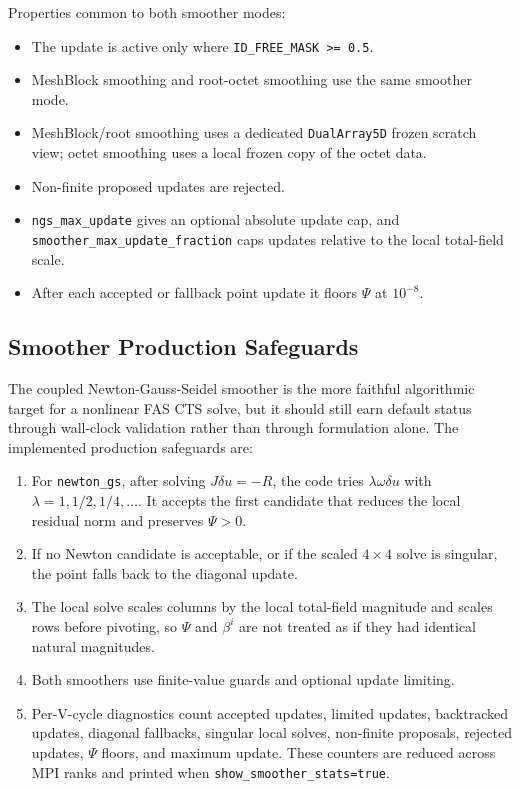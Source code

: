 \documentclass[11pt]{article}
\newcommand{\code}[1]{\texttt{#1}}
\begin{document}
Properties common to both smoother modes:
\begin{itemize}
  \item The update is active only where \code{ID\_FREE\_MASK >= 0.5}.
  \item MeshBlock smoothing and root-octet smoothing use the same smoother mode.
  \item MeshBlock/root smoothing uses a dedicated \code{DualArray5D} frozen
        scratch view; octet smoothing uses a local frozen copy of the octet data.
  \item Non-finite proposed updates are rejected.
  \item \code{ngs\_max\_update} gives an optional absolute update cap, and
        \code{smoother\_max\_update\_fraction} caps updates relative to the local
        total-field scale.
  \item After each accepted or fallback point update it floors \(\Psi\) at
        \(10^{-8}\).
\end{itemize}

\subsection{Smoother Production Safeguards}

The coupled Newton-Gauss-Seidel smoother is the more faithful algorithmic target
for a nonlinear FAS CTS solve, but it should still earn default status through
wall-clock validation rather than through formulation alone.  The implemented
production safeguards are:

\begin{enumerate}
  \item For \code{newton\_gs}, after solving \(J\delta u=-R\), the code tries
        \(\lambda\omega\delta u\) with \(\lambda=1,1/2,1/4,\ldots\).  It accepts
        the first candidate that reduces the local residual norm and preserves
        \(\Psi>0\).
  \item If no Newton candidate is acceptable, or if the scaled \(4\times4\) solve
        is singular, the point falls back to the diagonal update.
  \item The local solve scales columns by the local total-field magnitude and
        scales rows before pivoting, so \(\Psi\) and \(\beta^i\) are not treated
        as if they had identical natural magnitudes.
  \item Both smoothers use finite-value guards and optional update limiting.
  \item Per-V-cycle diagnostics count accepted updates, limited updates,
        backtracked updates, diagonal fallbacks, singular local solves,
        non-finite proposals, rejected updates, \(\Psi\) floors, and maximum
        update.  These counters are reduced across MPI ranks and printed when
        \code{show\_smoother\_stats=true}.
\end{enumerate}
\end{document}
